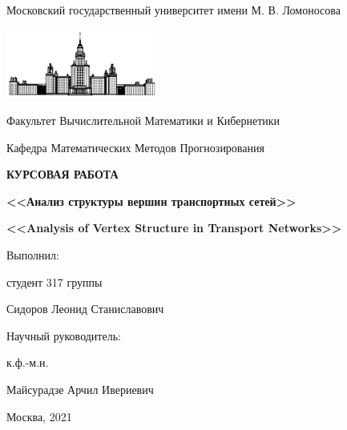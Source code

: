 \documentclass[12pt, fleqn, titlepage]{article}
\begin{document}
    \begin{titlepage}
        \begin{center}
            Московский государственный университет имени М. В. Ломоносова
            
            \includegraphics[width=50mm]{./pics/msu.jpg}
            
            \bigbreak
            Факультет Вычислительной Математики и Кибернетики

            Кафедра Математических Методов Прогнозирования

            \vspace{10mm}

            \textbf{\large КУРСОВАЯ РАБОТА}

            \vspace{10mm}

            \textbf{\Large <<Анализ структуры вершин транспортных сетей>>}

            \vspace{10mm}

            \textbf{\Large <<Analysis of Vertex Structure in Transport Networks>>}

            \vspace{10mm}
            
            \begin{flushright}
                \parbox{0.5\textwidth}{
                    Выполнил:

                    студент 317 группы
                    
                    Сидоров Леонид Станиславович

                    \vspace{5mm}

                    Научный руководитель:

                    к.ф.-м.н.
                    
                    Майсурадзе Арчил Ивериевич
                }
            \end{flushright}
            \vspace{\fill}
            Москва, 2021   
        \end{center}
    \end{titlepage}
\end{document}
